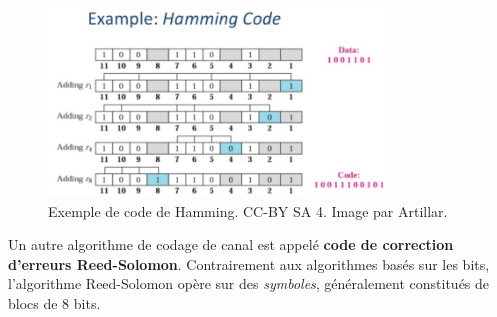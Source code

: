 \begin{figure}[H] %
    \centering
    \includegraphics[width=0.8\textwidth]{figures/6-28.jpg}
    \caption{Exemple de code de Hamming. CC-BY SA 4. Image par Artillar.}
    \label{fig:communication2}
\end{figure}
Un autre algorithme de codage de canal est appelé \textbf{code de correction d'erreurs Reed-Solomon}.  
Contrairement aux algorithmes basés sur les bits, l'algorithme Reed-Solomon opère sur des \textit{symboles}, généralement constitués de blocs de 8 bits.  

